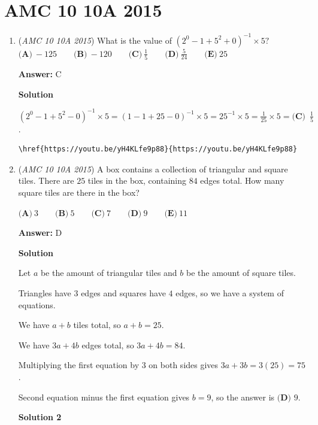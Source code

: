 \section{AMC 10 10A 2015}
        \begin{enumerate}
        	\item (\textit{AMC 10 10A 2015}) What is the value of $(2^0-1+5^2+0)^{-1}\times5?$
$\textbf{(A)}\ -125\qquad\textbf{(B)}\ -120\qquad\textbf{(C)}\ \frac{1}{5}\qquad\textbf{(D)}\ \frac{5}{24}\qquad\textbf{(E)}\ 25$

 \textbf{Answer: }C



\textbf{Solution}

$(2^0-1+5^2-0)^{-1}\times5 = (1-1+25-0)^{-1} \times 5 = 25^{-1} \times 5 = \frac{1}{25} \times 5 = \boxed{\textbf{(C) } \, \frac{1}{5}}$.

 \begin{verbatim}
\href{https://youtu.be/yH4KLfe9p88}{https://youtu.be/yH4KLfe9p88}
\end{verbatim}





	\item (\textit{AMC 10 10A 2015}) A box contains a collection of triangular and square tiles. There are $25$ tiles in the box, containing $84$ edges total. How many square tiles are there in the box?


 $\textbf{(A)}\ 3\qquad\textbf{(B)}\ 5\qquad\textbf{(C)}\ 7\qquad\textbf{(D)}\ 9\qquad\textbf{(E)}\ 11$

 \textbf{Answer: }D



\textbf{Solution}

Let $a$ be the amount of triangular tiles and $b$ be the amount of square tiles.

 Triangles have $3$ edges and squares have $4$ edges, so we have a system of equations.

 We have $a + b$ tiles total, so $a + b = 25$.

 We have $3a + 4b$ edges total, so $3a + 4b = 84$.

 Multiplying the first equation by $3$ on both sides gives $3a + 3b = 3(25) = 75$.

 Second equation minus the first equation gives $b = 9$, so the answer is $\boxed{\textbf{(D) }9}$.

 



\textbf{Solution 2}


\end{enumerate}
